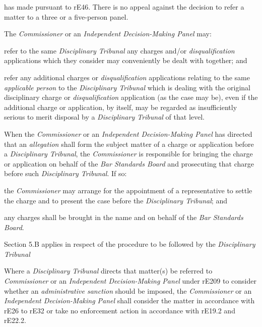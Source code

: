 has made pursuant to rE46. There is no appeal against the decision to
refer a matter to a three or a five-person panel.\\
\par
The \emph{Commissioner }or an \emph{Independent Decision-Making
Panel }may:\\\nl \item refer to the same \emph{Disciplinary Tribunal} any charges
and/or \emph{disqualification} applications which they consider may
conveniently be dealt with together; and\item refer any additional charges or \emph{disqualification} applications
relating to the same \emph{applicable person} to the \emph{Disciplinary
Tribunal} which is dealing with the original disciplinary charge
or \emph{disqualification} application (as the case may be), even if the
additional charge or application, by itself, may be regarded as
insufficiently serious to merit disposal by a \emph{Disciplinary
Tribunal} of that level.\ln
{}\par
When the \emph{Commissioner }or an \emph{Independent Decision-Making
Panel }has directed that an \emph{allegation} shall form the subject
matter of a charge or application before a \emph{Disciplinary Tribunal},
the \emph{Commissioner} is responsible for bringing the charge or
application on behalf of the \emph{Bar Standards Board} and prosecuting
that charge before such \emph{Disciplinary Tribunal}. If so:\\\nl \item the \emph{Commissioner} may arrange for the appointment of a
representative to settle the charge and to present the case before
the \emph{Disciplinary Tribunal}; and\item any charges shall be brought in the name and on behalf of
the \emph{Bar Standards Board}.\ln
{}\par
Section 5.B applies in respect of the procedure to be followed by
the \emph{Disciplinary Tribunal}\par
{}\par
Where a \emph{Disciplinary Tribunal} directs that matter(s) be referred
to \emph{Commissioner }or an \emph{Independent Decision-Making
Panel }under rE209 to consider whether an \emph{administrative
sanction} should be imposed, the \emph{Commissioner }or
an \emph{Independent Decision-Making Panel }shall consider the matter in
accordance with rE26 to rE32 or take no enforcement action in accordance
with rE19.2 and rE22.2.\\

